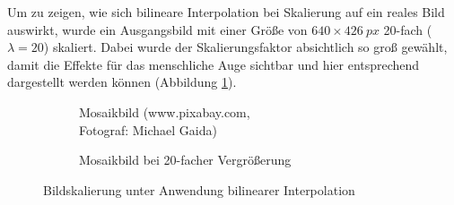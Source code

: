 \documentclass[
fontsize=10pt, 
listof = totoc,
parskip = half	
]{report}
\begin{document}
\bigskip
\noindent Um zu zeigen, wie sich bilineare Interpolation bei Skalierung auf ein reales Bild auswirkt, wurde ein Ausgangsbild mit einer Größe von $640\times 426~px$ 20-fach ($\lambda = 20$) skaliert. Dabei wurde der Skalierungsfaktor absichtlich so groß gewählt, damit die Effekte für das menschliche Auge sichtbar und hier entsprechend dargestellt werden können (Abbildung \ref{fig:MosaicBilinear}).
\\
\begin{figure}[H]
	\begin{subfigure}[t]{0.49\textwidth}
		\centering
		\caption{Mosaikbild (www.pixabay.com,\\ Fotograf: Michael Gaida)}
	\end{subfigure}\hfill
	\begin{subfigure}[t]{0.49\textwidth}
		\centering
		\caption{Mosaikbild bei 20-facher Vergrößerung}
	\end{subfigure}
	\caption{Bildskalierung unter Anwendung bilinearer Interpolation}
	\label{fig:MosaicBilinear}
\end{figure}
\end{document}
